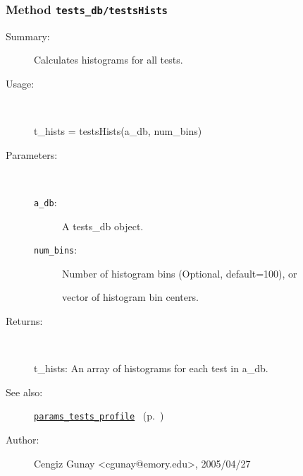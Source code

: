 \subsubsection[Method \texttt{testsHists}]{Method \texttt{tests\_db/testsHists}}%
%
\label{ref_tests_db__testsHists}%
\hypertarget{ref_tests_db__testsHists}{}%
\begin{description}
\item[Summary:]Calculates histograms for all tests.
%
\item[Usage:]~%
\begin{lyxcode}%
t\_hists = testsHists(a\_db, num\_bins)
%
\end{lyxcode}%
%
%
\item[Parameters:]~
\begin{description}%
\item[\texttt{a\_db}:]
 A tests\_db object.
\item[\texttt{num\_bins}:]
 Number of histogram bins (Optional, default=100), or

vector of histogram bin centers.\end{description}%
%
\item[Returns:]~

	t\_hists: An array of histograms for each test in a\_db.
%
%
\item[See also:]%
\hyperlink{ref_params_tests_profile}{\texttt{params\_tests\_profile}}%
\ (p.~\pageref{ref_params_tests_profile})%
%
%
\item[Author:]%
Cengiz Gunay <cgunay@emory.edu>, 2005/04/27%
\end{description}
\methodline%
